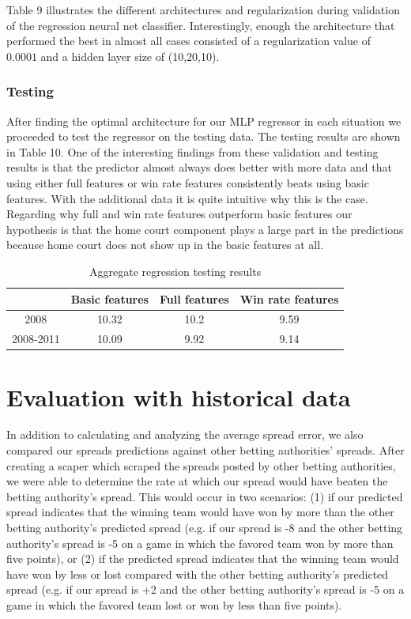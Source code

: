 \documentclass{article}
\begin{document}
Table 9 illustrates the different architectures and regularization during validation of the regression neural net classifier. Interestingly, enough the architecture that performed the best in almost all cases consisted of a regularization value of $0.0001$ and a hidden layer size of (10,20,10).

\subsubsection{Testing}

After finding the optimal architecture for our MLP regressor in each situation we proceeded to test the regressor on the testing data. The testing results are shown in Table 10. One of the interesting findings from these validation and testing results is that the predictor almost always does better with more data and that using either full features or win rate features consistently beats using basic features. With the additional data it is quite intuitive why this is the case. Regarding why full and win rate features outperform basic features our hypothesis is that the home court component plays a large part in the predictions because home court does not show up in the basic features at all.


\begin{table}
  \begin{center}
    \begin{tabular}{ | c | c | c | c |}
      \hline

            &            	Basic features & 	Full features & Win rate features \\ \hline
	2008  &     	10.32 & 	10.2  & 9.59   \\ \hline
	2008-2011 &  10.09&  9.92 & 9.14 \\ \hline

    \end{tabular}
  \end{center}
  \caption{Aggregate regression testing results}
\end{table}

\section{Evaluation with historical data}
In addition to calculating and analyzing the average spread error, we also compared our spreads predictions against other betting authorities' spreads. After creating a scaper which scraped the spreads posted by other betting authorities, we were able to determine the rate at which our spread would have beaten the betting authority's spread. This would occur in two scenarios: (1) if our predicted spread indicates that the winning team would have won by more than the other betting authority's predicted spread (e.g. if our spread is -8 and the other betting authority's spread is -5 on a game in which the favored team won by more than five points), or (2) if the predicted spread indicates that the winning team would have won by less or lost compared with the other betting authority's predicted spread (e.g. if our spread is +2 and the other betting authority's spread is -5 on a game in which the favored team lost or won by less than five points).
\end{document}

